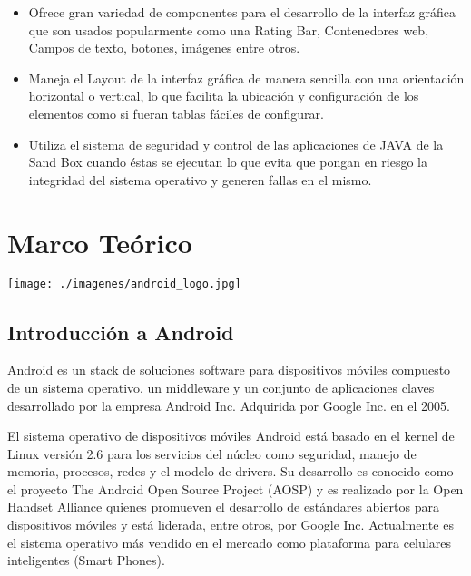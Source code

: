 \documentclass[letterpaper,12pt]{book}
\begin{document}
\begin{mainmatter}
\begin{itemize}
\item Ofrece gran variedad de componentes para el desarrollo de la interfaz
gráfica que son usados  popularmente como una Rating Bar, Contenedores
web, Campos de texto, botones, imágenes entre otros.

\item Maneja el  Layout de la interfaz gráfica  de manera sencilla con
  una orientación horizontal o  vertical, lo que facilita la ubicación
  y configuración  de los elementos  como si fueran tablas  fáciles de
  configurar.

\item Utiliza el sistema de seguridad y control de las aplicaciones de
  JAVA de  la Sand Box  cuando éstas se  ejecutan lo que  evita que
  pongan  en riesgo  la  integridad del  sistema  operativo y  generen
  fallas en el mismo.

\end{itemize}

\chapter{Marco Teórico}

\begin{center}
\texttt{[image: ./imagenes/android\_logo.jpg]}
\end{center}


\section{Introducción a Android}
Android es  un stack de soluciones software  para dispositivos móviles
compuesto  de un  sistema operativo,  un middleware  y un  conjunto de
aplicaciones   claves  desarrollado  por   la  empresa   Android  Inc.
Adquirida por Google Inc. en el 2005.

El sistema operativo de dispositivos móviles Android está basado en el
kernel  de  Linux versión  2.6  para  los  servicios del  núcleo  como
seguridad,  manejo  de  memoria,   procesos,  redes  y  el  modelo  de
drivers. Su desarrollo  es conocido como el proyecto  The Android Open
Source  Project (AOSP)  y es  realizado por  la Open  Handset Alliance
quienes   promueven  el   desarrollo  de   estándares   abiertos  para
dispositivos  móviles  y  está   liderada,  entre  otros,  por  Google
Inc. Actualmente  es el  sistema operativo más  vendido en  el mercado
como plataforma para celulares inteligentes (Smart Phones).


\end{mainmatter}
\end{document}

